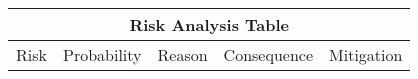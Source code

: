 \documentclass{sigchi}
\begin{document}
\begin{table*}[]
	\begin{tabular}{|l|l|l|l|l|}
		\hline
		\multicolumn{5}{|c|}{Risk Analysis Table}                                                                                                                                                                                                                                                                                                                                                                                                                                                                                                                                                                                                                                                                                                                                     \\ \hline
		Risk                                                                                                                                    & Probability & Reason                                                                                                                                                                                                                                                                       & Consequence                                                                                                                            & Mitigation                                                                                                                                                                                    \\ \hline

\end{tabular}
\end{table*}
\end{document}

